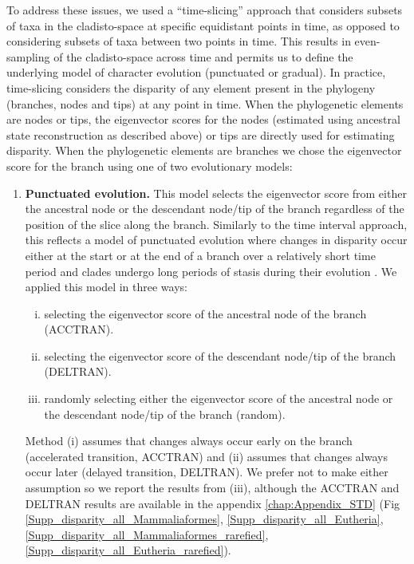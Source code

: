 To address these issues, we used a ``time-slicing'' approach that considers subsets of taxa in the cladisto-space at specific equidistant points in time, as opposed to considering subsets of taxa between two points in time.
This results in even-sampling of the cladisto-space across time and permits us to define the underlying model of character evolution (punctuated or gradual).  
In practice, time-slicing considers the disparity of any element present in the phylogeny (branches, nodes and tips) at any point in time.
When the phylogenetic elements are nodes or tips, the eigenvector scores for the nodes (estimated using ancestral state reconstruction as described above) or tips are directly used for estimating disparity.
When the phylogenetic elements are branches we chose the eigenvector score for the branch using one of two evolutionary models:
\begin{enumerate}
    \item{\textbf{Punctuated evolution.}} 
    This model selects the eigenvector score from either the ancestral node or the descendant node/tip of the branch regardless of the position of the slice along the branch. 
    Similarly to the time interval approach, this reflects a model of punctuated evolution where changes in disparity occur either at the start or at the end of a branch over a relatively short time period and clades undergo long periods of stasis during their evolution \citep{Gould1977,Hunt20112007}.
    We applied this model in three ways: 
    \begin{enumerate}[(i)]
      \item selecting the eigenvector score of the ancestral node of the branch (ACCTRAN).
      \item selecting the eigenvector score of the descendant node/tip of the branch (DELTRAN).
      \item randomly selecting either the eigenvector score of the ancestral node or the descendant node/tip of the branch (random).
    \end{enumerate}
    Method (i) assumes that changes always occur early on the branch (accelerated transition, ACCTRAN) and (ii) assumes that changes always occur later (delayed transition, DELTRAN).
    We prefer not to make either assumption so we report the results from (iii), although the ACCTRAN and DELTRAN results are available in the appendix \ref{chap:Appendix_STD} (Fig \ref{Supp_disparity_all_Mammaliaformes}, \ref{Supp_disparity_all_Eutheria}, \ref{Supp_disparity_all_Mammaliaformes_rarefied}, \ref{Supp_disparity_all_Eutheria_rarefied}).

\end{enumerate}
